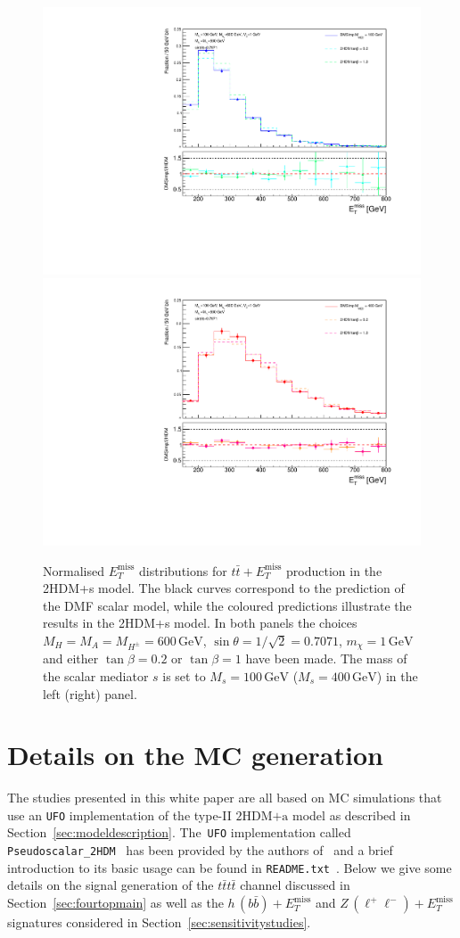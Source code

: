 \documentclass[review]{elsarticle}
\newcommand{\MET}{\ensuremath{E_T^\mathrm{miss}}\xspace}
\newcommand{\hdma}{\ensuremath{\textrm{2HDM+a}}\xspace}
\begin{document}
\begin{figure}
\centering
\includegraphics[width=.475\textwidth]{Met100GeV.pdf} \quad 
\includegraphics[width=.475\textwidth]{Met400GeV.pdf}
\vspace{2mm}
\caption{ Normalised $\MET$ distributions for $t \bar t + \MET$ production in the 2HDM+s model. The black curves correspond to the prediction of the DMF scalar   model, while the coloured predictions illustrate the results in the 2HDM+s  model. In both panels the choices $M_H = M_A = M_{H^\pm} = 600 \, {\mathrm{GeV}}$, $\sin\theta=1/\sqrt{2}=0.7071$, $m_\chi = 1 \, {\mathrm{GeV}}$ and either $\tan \beta = 0.2$ or $\tan \beta = 1$ have been made. The mass of the scalar mediator $s$ is set to $M_s = 100 \, {\mathrm{GeV}}$ ($M_s = 400 \, {\mathrm{GeV}}$) in the left (right) panel.}
\label{fig:ttMETscalar}
\end{figure}


\section{Details on the MC generation}
\label{app:mcgeneration}

The studies presented in this white paper are all based on MC simulations that use an {\tt UFO} implementation of the type-II \hdma model as described in Section~\ref{sec:modeldescription}. The~{\tt UFO} implementation  called {\tt Pseudoscalar\_2HDM}~\cite{hdmaUFO} has been provided by the authors of~\cite{Bauer:2017ota} and a brief introduction to its basic usage can be found in {\tt README.txt}~\cite{hdmaREADME}. Below we give some details on   the signal generation of the $t \bar t t \bar t$ channel discussed in Section~\ref{sec:fourtopmain} as well as  the $h \, (b \bar b) + \MET$ and $Z \, (\ell^+ \ell^-)+ \MET$ signatures  considered in Section~\ref{sec:sensitivitystudies}.
\end{document}
